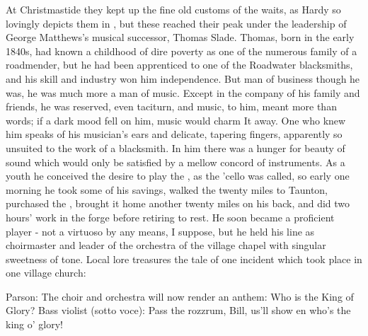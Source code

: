 At Christmastide they kept up the fine old customs of the waits, as Hardy so lovingly depicts them in , but these reached their peak under the leadership of George Matthews's musical successor, Thomas Slade. Thomas, born in the early 1840s, had known a childhood of dire poverty as one of the numerous family of a roadmender, but he had been apprenticed to one of the Roadwater blacksmiths, and his skill and industry won him independence. But man of business though he was, he was much more a man of music. Except in the company of his family and friends, he was reserved, even taciturn, and music, to him, meant more than words; if a dark mood fell on him, music would charm It away. One who knew him speaks of his musician's ears and delicate, tapering fingers, apparently so unsuited to the work of a blacksmith. In him there was a hunger for beauty of sound which would only be satisfied by a mellow concord of instruments. As a youth he conceived the desire to play the , as the 'cello was called, so early one morning he took some of his savings, walked the twenty miles to Taunton, purchased the , brought it home another twenty miles on his back, and did two hours' work in the forge before retiring to rest. He soon became a proficient player - not a virtuoso by any means, I suppose, but he held his line as choirmaster and leader of the orchestra of the village chapel with singular sweetness of tone. Local lore treasures the tale of one incident which took place in one village church:

Parson: The choir and orchestra will now render an anthem: Who is the King of Glory?
Bass violist (sotto voce): Pass the rozzrum, Bill, us'll show en who’s the king o’ glory!

